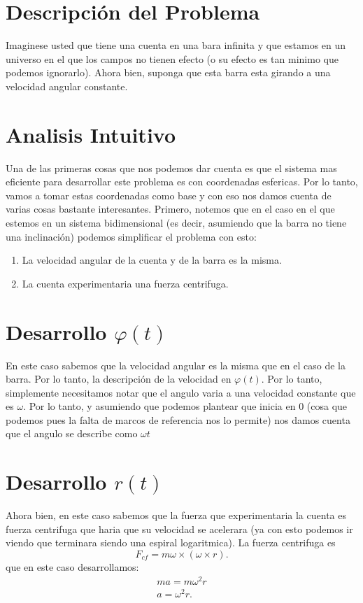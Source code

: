 \documentclass[12pt]{article}
\begin{document}
\section*{Descripción del Problema}

Imaginese usted que tiene una cuenta en una bara infinita y que estamos en un universo en el que los campos no tienen efecto (o su efecto es tan minimo que podemos ignorarlo). Ahora bien, suponga que esta barra esta girando a una velocidad angular constante.

\section*{Analisis Intuitivo}

Una de las primeras cosas que nos podemos dar cuenta es que el sistema mas eficiente para desarrollar este problema es con coordenadas esfericas. Por lo tanto, vamos a tomar estas coordenadas como base y con eso nos damos cuenta de varias cosas bastante interesantes. Primero, notemos que en el caso en el que estemos en un sistema bidimensional (es decir, asumiendo que la barra no tiene una inclinación) podemos simplificar el problema con esto:
\begin{enumerate}
  \item La velocidad angular de la cuenta y de la barra es la misma.
  \item La cuenta experimentaria una fuerza centrifuga.
\end{enumerate}

\section*{Desarrollo $\varphi\left( t \right) $ }

En este caso sabemos que la velocidad angular es la misma que en el caso de la barra. Por lo tanto, la descripción de la velocidad en $\varphi\left( t \right) $. Por lo tanto, simplemente necesitamos notar que el angulo varia a una velocidad constante que es $\omega$. Por lo tanto, y asumiendo que podemos plantear que inicia en $0$ (cosa que podemos pues la falta de marcos de referencia nos lo permite) nos damos cuenta que el angulo se describe como $\omega t$

\section*{Desarrollo $r\left( t \right) $ }

Ahora bien, en este caso sabemos que la fuerza que experimentaria la cuenta es fuerza centrifuga que haria que su velocidad se acelerara (ya con esto podemos ir viendo que terminara siendo una espiral logaritmica). La fuerza centrifuga es \[
F_{cf} = m\omega\times \left( \omega \times r \right) 
.\] que en este caso desarrollamos:
\begin{align*}
  ma = m\omega^2r\\
  a = \omega^2r
.\end{align*}
\end{document}
